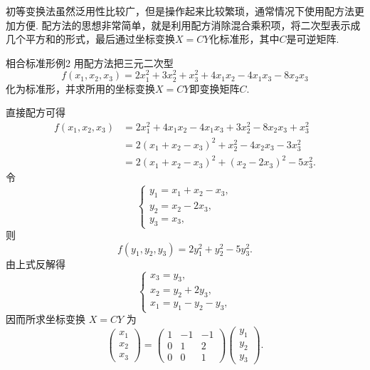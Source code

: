 初等变换法虽然泛用性比较广，但是操作起来比较繁琐，通常情况下使用配方法更加方便. 配方法的思想非常简单，就是利用配方消除混合乘积项，将二次型表示成几个平方和的形式，最后通过坐标变换$X=CY$化标准形，其中$C$是可逆矩阵.

\begin{example}{}{相合标准形例2}
    用配方法把三元二次型
    \[f(x_1,x_2,x_3)=2x_1^2+3x_2^2+x_3^2+4x_1x_2-4x_1x_3-8x_2x_3\]
    化为标准形，并求所用的坐标变换$X=CY$即变换矩阵$C$.
\end{example}

\begin{solution}
    直接配方可得
    \begin{align*}
        f(x_1,x_2,x_3)
         & = 2x_1^2+4x_1x_2-4x_1x_3+3x_2^2-8x_2x_3+x_3^2 \\
         & = 2(x_1+x_2-x_3)^2+x_2^2-4x_2x_3-3x_3^2         \\
         & = 2(x_1+x_2-x_3)^2+(x_2-2x_3)^2-5x_3^2.
    \end{align*}
    令
    \[
        \begin{cases}
            y_1 = x_1+x_2-x_3, \\
            y_2 = x_2-2x_3,    \\
            y_3 = x_3,
        \end{cases}
    \]
    则
    \[
        f(y_1,y_2,y_3)=2y_1^2+y_2^2-5y_3^2.
    \]
    由上式反解得
    \[
        \begin{cases}
            x_3 = y_3,             \\
            x_2 = y_2+2y_3,        \\
            x_1 = y_1-y_2-y_3,
        \end{cases}
    \]
    因而所求坐标变换 $X=CY$ 为
    \[
        \begin{pmatrix}
            x_1 \\
            x_2 \\
            x_3
        \end{pmatrix}
        =
        \begin{pmatrix}
            1 & -1 & -1 \\
            0 & 1 & 2   \\
            0 & 0 & 1
        \end{pmatrix}
        \begin{pmatrix}
            y_1 \\
            y_2 \\
            y_3
        \end{pmatrix}.
    \]
\end{solution}

